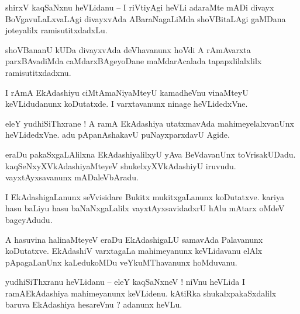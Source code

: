 \documentclass{article}
\begin{document}
\begin{mn}%
shirxV kaqSaNxnu heVLidanu -- I riVtiyAgi heVLi adaraMte mADi divayx BoVgavuLaLxvaLAgi divayxvAda 
ABaraNagaLiMda shoVBitaLAgi gaMDana joteyalilx ramisutitxdadxLu.
\end{mn}

\begin{mn}%
shoVBananU kUDa divayxvAda deVhavanunx hoVdi A rAmAvarxta parxBAvadiMda caMdarxBAgeyoDane 
maMdarAcalada tapapxlilalxlilx ramisutitxdadxnu.
\end{mn}

\begin{mn}%
I rAmA EkAdashiyu ciMtAmaNiyaMteyU kamadheVnu vinaMteyU keVLidudanunx koDutatxde. I varxtavanunx 
ninage heVLidedxVne.
\end{mn}

\begin{mn}%
eleY yudhiSiThxrane ! A ramA EkAdashiya utatxmavAda mahimeyelalxvanUnx heVLidedxVne. adu 
pApanAshakavU puNayxparxdavU Agide.
\end{mn}

\begin{mn}%
eraDu pakaSxgaLAlilxna EkAdashiyalilxyU yAva BeVdavanUnx toVrisakUDadu. kaqSeNxyXVkAdashiyaMteyeV 
shukelxyXVkAdashiyU iruvudu. vayxtAyxsavanunx mADaleVbAradu.
\end{mn}

\begin{mn}%
I EkAdashigaLanunx seVvisidare Bukitx mukitxgaLanunx koDutatxve. kariya hasu baLiyu hasu 
baNaNxgaLalilx vayxtAyxsavidadxrU hAlu mAtarx oMdeV bageyAdudu.
\end{mn}

\begin{mn}%
A hasuvina halinaMteyeV eraDu EkAdashigaLU samavAda Palavanunx koDutatxve. EkAdashiV varxtagaLa 
mahimeyanunx keVLidavanu elAlx pApagaLanUnx kaLedukoMDu veYkuMThavanunx hoMduvanu.
\end{mn}


\begin{mn}%
yudhiSiThxranu heVLidanu -- eleY kaqSaNxneV ! niVnu heVLida I ramAEkAdashiya mahimeyanunx 
keVLidenu. kAtiRka shukalxpakaSxdalilx baruva EkAdashiya hesareVnu ? adanunx heVLu.
\end{mn}
\end{document}
